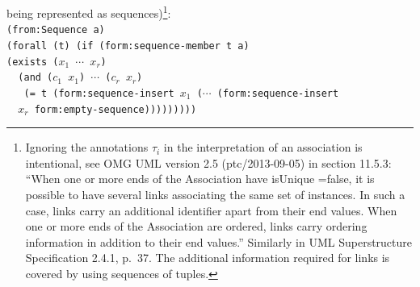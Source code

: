 \documentclass[10pt,fleqn,final]{scrreprt}
\newenvironment{definitions}[0]{\medskip }{}
\newcommand{\white}[1]{{\color{white}{#1}}}
\newcommand{\qqquad}{\white{x}\qquad}
\begin{document}
\begin{definitions}
\begin{itemize}
being represented as sequences)\footnote{Ignoring the annotations $\tau_i$ in the interpretation of an association is intentional, see OMG UML version 2.5 (ptc/2013-09-05) in section 11.5.3: ``When one or more ends of the Association have isUnique =false, it is possible to have several links associating the same set of
instances. In such a case, links carry an additional identifier apart from their end values.
When one or more ends of the Association are ordered, links carry ordering information in addition to their end values.'' Similarly in UML Superstructure Specification 2.4.1, p.~37.  The additional information required for links is covered by using sequences of tuples.}:\\
\texttt{(from:Sequence a)}\\
\texttt{(forall (t) (if (form:sequence-member t a)\\
\qqquad\qqquad  (exists ($x_1$ $\cdots$ $x_r$)\\
\qqquad\qqquad\qqquad\ \  (and ($c_1$ $x_1$) $\cdots$ ($c_r$ $x_r$)\\
\ \ \  (= t (form:sequence-insert $x_1$ ($\cdots$ (form:sequence-insert\\
\qqquad\qqquad\qqquad\ \  $x_r$ form:empty-sequence)))))))))}


\end{itemize}
\end{definitions}
\end{document}
